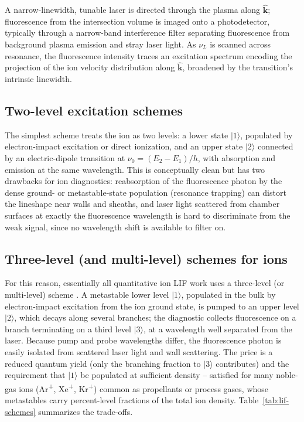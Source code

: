 A narrow-linewidth, tunable laser is directed through the plasma along $\hat{\mathbf{k}}$; fluorescence from the intersection volume is imaged onto a photodetector, typically through a narrow-band interference filter separating fluorescence from background plasma emission and stray laser light. As $\nu_{L}$ is scanned across resonance, the fluorescence intensity traces an excitation spectrum encoding the projection of the ion velocity distribution along $\hat{\mathbf{k}}$, broadened by the transition's intrinsic linewidth.

\subsection{Two-level excitation schemes}

The simplest scheme treats the ion as two levels: a lower state $\lvert 1 \rangle$, populated by electron-impact excitation or direct ionization, and an upper state $\lvert 2 \rangle$ connected by an electric-dipole transition at $\nu_{0} = (E_{2}-E_{1})/h$, with absorption and emission at the same wavelength. This is conceptually clean but has two drawbacks for ion diagnostics: reabsorption of the fluorescence photon by the dense ground- or metastable-state population (resonance trapping) can distort the lineshape near walls and sheaths, and laser light scattered from chamber surfaces at exactly the fluorescence wavelength is hard to discriminate from the weak signal, since no wavelength shift is available to filter on.

\subsection{Three-level (and multi-level) schemes for ions}

For this reason, essentially all quantitative ion LIF work uses a three-level (or multi-level) scheme \cite{ref0292}. A metastable lower level $\lvert 1 \rangle$, populated in the bulk by electron-impact excitation from the ion ground state, is pumped to an upper level $\lvert 2 \rangle$, which decays along several branches; the diagnostic collects fluorescence on a branch terminating on a third level $\lvert 3 \rangle$, at a wavelength well separated from the laser. Because pump and probe wavelengths differ, the fluorescence photon is easily isolated from scattered laser light and wall scattering. The price is a reduced quantum yield (only the branching fraction to $\lvert 3\rangle$ contributes) and the requirement that $\lvert 1 \rangle$ be populated at sufficient density -- satisfied for many noble-gas ions (Ar\textsuperscript{+}, Xe\textsuperscript{+}, Kr\textsuperscript{+}) common as propellants or process gases, whose metastables carry percent-level fractions of the total ion density. Table~\ref{tab:lif-schemes} summarizes the trade-offs.


